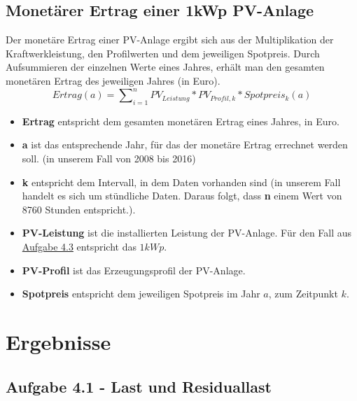 \documentclass[a4paper,12pt]{article}
\begin{document}
	\subsection{Monetärer Ertrag einer 1kWp PV-Anlage}
	Der monetäre Ertrag einer PV-Anlage ergibt sich aus der Multiplikation der Kraftwerkleistung, den Profilwerten und dem jeweiligen Spotpreis. Durch Aufsummieren der einzelnen Werte eines Jahres, erhält man den gesamten monetären Ertrag des jeweiligen Jahres (in Euro).
	\begin{equation}
	Ertrag(a) = \sum\nolimits_{i=1}^n PV_{Leistung} * PV_{Profil,k} * Spotpreis_k(a)
	\end{equation}
	\begin{itemize}
		\item \textbf{Ertrag} entspricht dem gesamten monetären Ertrag eines Jahres, in Euro.
		\item \textbf{a} ist das entsprechende Jahr, für das der monetäre Ertrag errechnet werden soll. (in unserem Fall von 2008 bis 2016)
		\item \textbf{k} entspricht dem Intervall, in dem Daten vorhanden sind (in unserem Fall handelt es sich um stündliche Daten. Daraus folgt, dass \textbf{n} einem Wert von 8760 Stunden entspricht.).
		\item \textbf{PV-Leistung} ist die installierten Leistung der PV-Anlage. Für den Fall aus \hyperref[sec:Aufgabenstellung43]{Aufgabe 4.3} entspricht das $1kWp$.
		\item \textbf{PV-Profil} ist das Erzeugungsprofil der PV-Anlage.
		\item \textbf{Spotpreis} entspricht dem jeweiligen Spotpreis im Jahr $a$, zum Zeitpunkt $k$.
	\end{itemize}
	\newpage
	\section{Ergebnisse}
	\label{sec:Ergebnisse}
	\subsection{Aufgabe 4.1 - Last und Residuallast}
\end{document}
